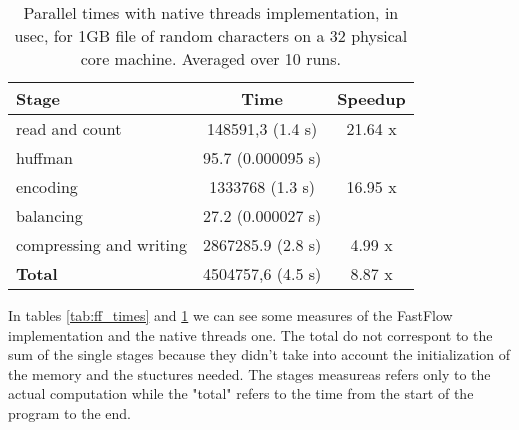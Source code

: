 \documentclass[12pt, letterpaper]{article}  %
\begin{document}
\begin{table}[h]
\begin{center}
\begin{tabular}{l c c}
    \textbf{Stage} & \textbf{Time} & \textbf{Speedup}  \\
    \hline
    read and count & 148591,3 (1.4 s) & 21.64 x\\
    \hline
    huffman & 95.7 (0.000095 s) \\
    \hline
    encoding & 1333768  (1.3 s) & 16.95 x \\
    \hline
    balancing & 27.2 (0.000027 s)\\
    \hline
    compressing and writing & 2867285.9  (2.8 s) & 4.99 x\\
    \hline
    \textbf{Total} & 4504757,6 (4.5 s) & 8.87 x\\ 
\end{tabular}
\caption{Parallel times with native threads implementation, in usec, for 1GB file of random characters on a 32 physical core machine. Averaged over 10 runs.}    
\label{tab:thr_times}
\end{center}
\end{table}

In tables \ref{tab:ff_times} and \ref{tab:thr_times} we can see some measures of the FastFlow implementation and the native threads one. The total do not correspont to the sum of the single stages because they didn't take into account the initialization of the memory and the stuctures needed. The stages measureas refers only to the actual computation while the "total" refers to the time from the start of the program to the end.







\newpage \FloatBarrier


\end{document}
